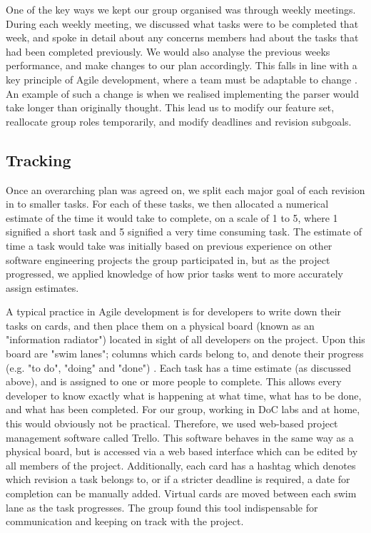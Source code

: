 \documentclass[a4paper, 11pt]{article}
\begin{document}
    One of the key ways we kept our group organised was through weekly
    meetings.  During each weekly meeting, we discussed what tasks were to be
    completed that week, and spoke in detail about any concerns members had
    about the tasks that had been completed previously. We would also analyse
    the previous weeks performance, and make changes to our plan accordingly.
    This falls in line with a key principle of Agile development, where a team
    must be adaptable to change \cite{agilemanifesto}. 
    An example of such a change is when we realised implementing the parser 
    would take longer than originally thought. This lead us to modify our 
    feature set, reallocate group roles temporarily, and modify deadlines 
    and revision subgoals.

  \subsection{Tracking}
    Once an overarching plan was agreed on, we split each major goal of each
    revision in to smaller tasks. For each of these tasks, we then allocated a
    numerical estimate of the time it would take to complete, on a scale of 1
    to 5, where 1 signified a short task and 5 signified a very time consuming
    task. The estimate of time a task would take was initially based on
    previous experience on other software engineering projects the group
    participated in, but as the project progressed, we applied knowledge of how
    prior tasks went to more accurately assign estimates.

    A typical practice in Agile development is for developers to write down
    their tasks on cards, and then place them on a physical board (known as an
    "information radiator") located in sight of all developers on the project.
    Upon this board are "swim lanes"; columns which cards belong to, and denote
    their progress (e.g. "to do", "doing" and "done") \cite{agileswimlane}. 
    Each task has a time
    estimate (as discussed above), and is assigned to one or more people to
    complete.  This allows every developer to know exactly what is happening at
    what time, what has to be done, and what has been completed. For our group,
    working in DoC labs and at home, this would obviously not be practical.
    Therefore, we used web-based project management software called
    Trello\cite{trello}. This software behaves in the same way as a physical board, but is
    accessed via a web based interface which can be edited by all members of
    the project.  Additionally, each card has a hashtag which denotes which
    revision a task belongs to, or if a stricter deadline is required, a date
    for completion can be manually added.  Virtual cards are moved between each
    swim lane as the task progresses. The group found this tool indispensable
    for communication and keeping on track with the project.
\end{document}

